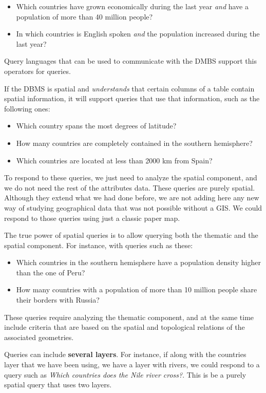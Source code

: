 \begin{itemize}
 \item Which countries have grown economically during the last year \emph{and} have a population of more than 40 million people?
\item In which countries is English spoken \emph{and} the population increased during the last year?
\end{itemize}

Query languages that can be used to communicate with the DMBS support this operators for queries.

If the DBMS is spatial and \emph{understands} that certain columns of a table contain spatial information, it will support queries that use that information, such as the following ones:

\begin{itemize}
\item Which country spans the most degrees of latitude?
\item How many countries are completely contained in the southern hemisphere?
\item Which countries are located at less than 2000 km from Spain?
\end{itemize}

To respond to these queries, we just need to analyze the spatial component, and we do not need the rest of the attributes data. These queries are purely spatial. Although they extend what we had done before, we are not adding here any new way of studying geographical data that was not possible without a GIS. We could respond to those queries using just a classic paper map.

The true power of spatial queries is to allow querying both the thematic and the spatial component. For instance, with queries such as these:

\begin{itemize}
 \item Which countries in the southern hemisphere have a population density higher than the one of Peru?
\item How many countries with a population of more than 10 million people share their borders with Russia?
\end{itemize}

These queries require analyzing the thematic component, and at the same time include criteria that are based on the spatial and topological relations of the associated geometries.

Queries can include \textbf{several layers}. For instance, if along with the countries layer that we have been using, we have a layer with rivers, we could respond to a query such as \emph{Which countries does the Nile river cross?}. This is be a purely spatial query that uses two layers.

